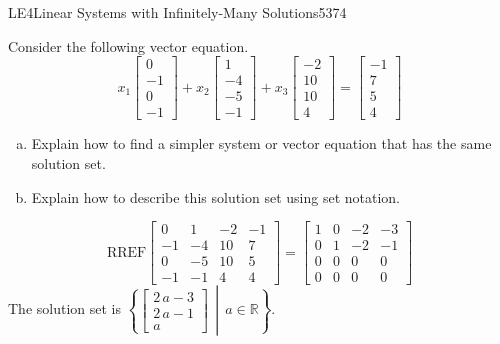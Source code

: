 \begin{exercise}{LE4}{Linear Systems with Infinitely-Many Solutions}{5374} 
\begin{exerciseStatement} 

 Consider the following vector equation. \[     
        x_{1} \left[\begin{array}{c}
0 \\
-1 \\
0 \\
-1
\end{array}\right] + x_{2} \left[\begin{array}{c}
1 \\
-4 \\
-5 \\
-1
\end{array}\right] + x_{3} \left[\begin{array}{c}
-2 \\
10 \\
10 \\
4
\end{array}\right] = \left[\begin{array}{c}
-1 \\
7 \\
5 \\
4
\end{array}\right]
      \] 

 

\begin{enumerate}[(a)]
\item  

 Explain how to find a simpler system or vector equation that has the same solution set. 

 
\item  

 Explain how to describe this solution set using set notation. 

 
\end{enumerate}

     \end{exerciseStatement}
 \begin{exerciseAnswer} 

 \[\mathrm{RREF}\left[\begin{array}{ccc|c}
0 & 1 & -2 & -1 \\
-1 & -4 & 10 & 7 \\
0 & -5 & 10 & 5 \\
-1 & -1 & 4 & 4
\end{array}\right]=\left[\begin{array}{ccc|c}
1 & 0 & -2 & -3 \\
0 & 1 & -2 & -1 \\
0 & 0 & 0 & 0 \\
0 & 0 & 0 & 0
\end{array}\right]\] The solution set is \( \left\{ \left[\begin{array}{c}
2 \, a - 3 \\
2 \, a - 1 \\
a
\end{array}\right] \,\middle|\, a \in\mathbb R \right\} \). 

 \end{exerciseAnswer}
 \end{exercise}


